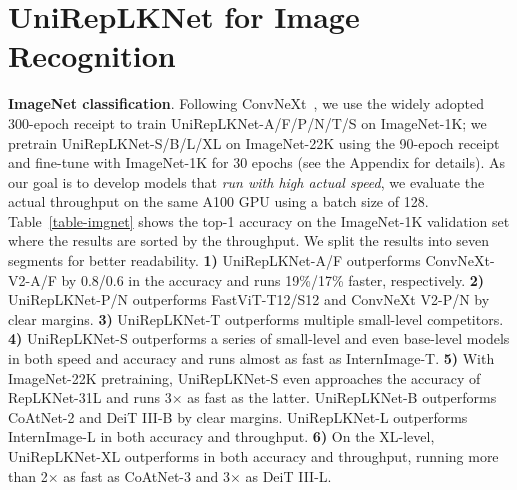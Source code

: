 \documentclass[10pt,twocolumn,letterpaper]{article}
\begin{document}
    \vspace{-0.2in}

 \section{UniRepLKNet for Image Recognition}

\textbf{ImageNet classification}. Following ConvNeXt~\cite{liu2022convnet}, we use the widely adopted 300-epoch receipt to train UniRepLKNet-A/F/P/N/T/S on ImageNet-1K; we pretrain UniRepLKNet-S/B/L/XL on ImageNet-22K using the 90-epoch receipt and fine-tune with ImageNet-1K for 30 epochs (see the Appendix for details). As our goal is to develop models that \emph{run with high actual speed}, we evaluate the actual throughput on the same A100 GPU using a batch size of 128. Table~\ref{table-imgnet} shows the top-1 accuracy on the ImageNet-1K validation set where the results are sorted by the throughput. We split the results into seven segments for better readability. \textbf{1)} UniRepLKNet-A/F outperforms ConvNeXt-V2-A/F by 0.8/0.6 in the accuracy and runs 19\%/17\% faster, respectively. \textbf{2)} UniRepLKNet-P/N outperforms FastViT-T12/S12 and ConvNeXt V2-P/N by clear margins. \textbf{3)} UniRepLKNet-T outperforms multiple small-level competitors. \textbf{4)} UniRepLKNet-S outperforms a series of small-level and even base-level models in both speed and accuracy and runs almost as fast as InternImage-T. \textbf{5)} With ImageNet-22K pretraining, UniRepLKNet-S even approaches the accuracy of RepLKNet-31L and runs 3$\times$ as fast as the latter. UniRepLKNet-B outperforms CoAtNet-2 and DeiT III-B by clear margins. UniRepLKNet-L outperforms InternImage-L in both accuracy and throughput. \textbf{6)} On the XL-level, UniRepLKNet-XL outperforms in both accuracy and throughput, running more than 2$\times$ as fast as CoAtNet-3 and 3$\times$ as DeiT III-L.
\end{document}
